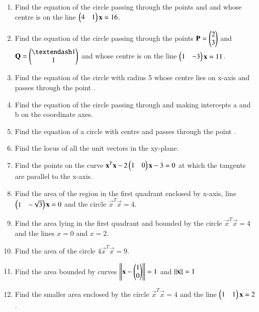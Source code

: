 \begin{enumerate}[label=\arabic*.,ref=\thesubsection.\theenumi]
\begin{enumerate}
\end{enumerate}
\solution 

\item Find the equation of the circle passing through the points  and  and whose centre is on the line $\begin{pmatrix}4 & 1\end{pmatrix}\mathbf{x} = 16$.
\\
\solution 

\item Find the equation of the circle passing through the points $\mathbf{P} =\begin{pmatrix}2\\3\end{pmatrix}$ and $\vec{Q} = \myvec{–1\\1}$ and whose centre is on the line $\begin{pmatrix}1 & -3\end{pmatrix}\mathbf{x} = 11$.
\solution 

\item Find the equation of the circle with radius 5 whose centre lies on x-axis and passes through the point .
\item Find the equation of the circle passing through  and making intercepts a and b on the coordinate axes.
\item Find the equation of a circle with centre  and passes through the point . 
\item Find the locus of all the unit vectors in the xy-plane.
%
\item Find the points on the curve $\mathbf{x}^T\mathbf{x}-2\begin{pmatrix}1 & 0\end{pmatrix}\mathbf{x} -3 =0$  at which the tangents are parallel to the x-axis.
%
\item  Find the area of the region in the first quadrant enclosed by x-axis, line $\begin{pmatrix}1 & -\sqrt{3}\end{pmatrix}\mathbf{x} =0$ and the circle $\vec{x}^T\vec{x}=4$.
%
\item Find the area lying in the first quadrant and bounded by the circle $\vec{x}^T\vec{x}=4$ and the lines $x = 0$ and $x = 2$.
%
\item Find the area of the circle $4\vec{x}^T\vec{x}=9$.
\item  Find the area bounded by curves $\left\lVert\mathbf{x}-\begin{pmatrix}1\\0\end{pmatrix}\right\rVert = 1$ and $\left\lVert\mathbf{x}\right\rVert=1$
\item Find the smaller area enclosed by the circle $\vec{x}^T\vec{x}=4$ and the line $\begin{pmatrix}1 & 1\end{pmatrix}\mathbf{x} = 2$.

\end{enumerate}
